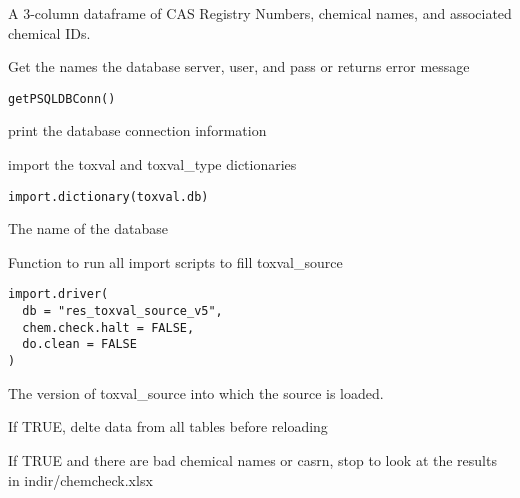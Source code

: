 \documentclass[letterpaper]{book}
\begin{document}
%
\begin{Value}
A 3-column dataframe of CAS Registry Numbers, chemical names, and associated chemical IDs.
\end{Value}
%
\begin{Description}\relax
Get the names the database server, user, and pass or returns error message
\end{Description}
%
\begin{Usage}
\begin{verbatim}
getPSQLDBConn()
\end{verbatim}
\end{Usage}
%
\begin{Value}
print the database connection information
\end{Value}
%
\begin{Description}\relax
import the toxval and toxval\_type dictionaries
\end{Description}
%
\begin{Usage}
\begin{verbatim}
import.dictionary(toxval.db)
\end{verbatim}
\end{Usage}
%
\begin{Arguments}
\begin{ldescription}
\item[\code{toxval.db}] The name of the database
\end{ldescription}
\end{Arguments}
%
\begin{Description}\relax
Function to run all import scripts to fill toxval\_source
\end{Description}
%
\begin{Usage}
\begin{verbatim}
import.driver(
  db = "res_toxval_source_v5",
  chem.check.halt = FALSE,
  do.clean = FALSE
)
\end{verbatim}
\end{Usage}
%
\begin{Arguments}
\begin{ldescription}
\item[\code{db}] The version of toxval\_source into which the source is loaded.

\item[\code{do.clean}] If TRUE, delte data from all tables before reloading

\item[\code{chem.chek.halt}] If TRUE and there are bad chemical names or casrn,
stop to look at the results in indir/chemcheck.xlsx
\end{ldescription}
\end{Arguments}
\end{document}
